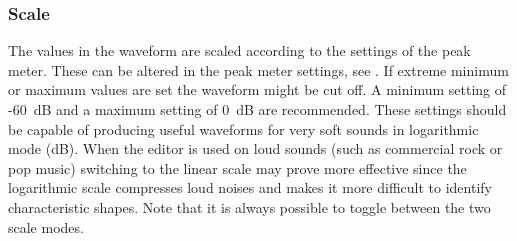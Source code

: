 \subsubsection{\label{ref:Scalemode}Scale}
The values in the waveform are scaled according to the settings of the
peak meter. These can be altered in the peak meter settings,
see . If extreme minimum or
maximum values are set the waveform might be cut off.  A minimum
setting of {}-60~dB and a maximum setting of 0~dB are recommended.
These settings should be capable of producing useful waveforms for very
soft sounds in logarithmic mode (dB). When the editor is used on loud
sounds (such as commercial rock or pop music) switching to the linear
scale may prove more effective since the logarithmic scale compresses
loud noises and makes it more difficult to identify characteristic
shapes. Note that it is always possible to toggle between the two scale
modes.


